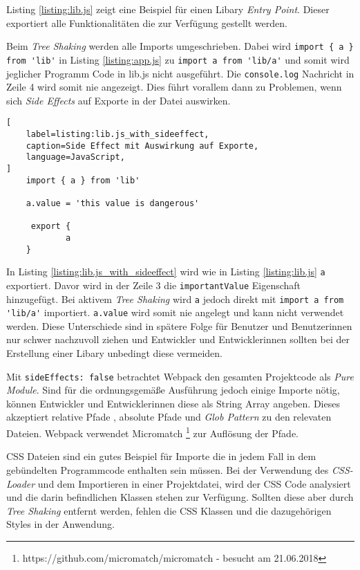 Listing \ref{listing:lib.js} zeigt eine Beispiel für einen Libary \textit{Entry Point}. Dieser exportiert alle Funktionalitäten die zur Verfügung gestellt werden.

Beim \textit{Tree Shaking} werden alle Imports umgeschrieben. Dabei wird \lstinline|import { a } from 'lib'| in Listing \ref{listing:app.js} zu \lstinline{import a from 'lib/a'} und somit wird jeglicher Programm Code in lib.js nicht ausgeführt. Die \lstinline{console.log} Nachricht in Zeile 4 wird somit nie angezeigt. Dies führt vorallem dann zu Problemen, wenn sich \textit{Side Effects} auf Exporte in der Datei auswirken. 

\begin{lstlisting}[
    label=listing:lib.js_with_sideeffect,
	caption=Side Effect mit Auswirkung auf Exporte,
	language=JavaScript,
]
	import { a } from 'lib'
    
	a.value = 'this value is dangerous'    
    
     export {
    		a
    }
\end{lstlisting}

In Listing \ref{listing:lib.js_with_sideeffect} wird wie in Listing \ref{listing:lib.js} \lstinline{a} exportiert. Davor wird in der Zeile 3 die \lstinline{importantValue} Eigenschaft hinzugefügt. Bei aktivem \textit{Tree Shaking} wird \lstinline{a} jedoch direkt mit \lstinline{import a from 'lib/a'} importiert. \lstinline{a.value} wird somit nie angelegt und kann nicht verwendet werden. Diese Unterschiede sind in spätere Folge für Benutzer und Benutzerinnen nur schwer nachzuvoll ziehen und Entwickler und Entwicklerinnen sollten bei der Erstellung einer Libary unbedingt diese vermeiden.\autocite{WebpackTreeShaking}

Mit \lstinline{sideEffects: false} betrachtet Webpack den gesamten Projektcode als \textit{Pure Module}. Sind für die ordnungsgemäße Ausführung jedoch einige Importe nötig, können Entwickler und Entwicklerinnen diese als String Array angeben. Dieses akzeptiert relative Pfade , absolute Pfade und \textit{Glob Pattern} zu den relevaten Dateien. Webpack verwendet Micromatch \footnote{https://github.com/micromatch/micromatch - besucht am 21.06.2018} zur Auflösung der Pfade.\autocite{WebpackTreeShaking}

CSS Dateien sind ein gutes Beispiel für Importe die in jedem Fall in dem gebündelten Programmcode enthalten sein müssen. Bei der Verwendung des \textit{CSS-Loader} und dem Importieren in einer Projektdatei, wird der CSS Code analysiert und die darin befindlichen Klassen stehen zur Verfügung. Sollten diese aber durch \textit{Tree Shaking} entfernt werden, fehlen die CSS Klassen und die dazugehörigen Styles in der Anwendung.
\autocite{WebpackTreeShaking}


